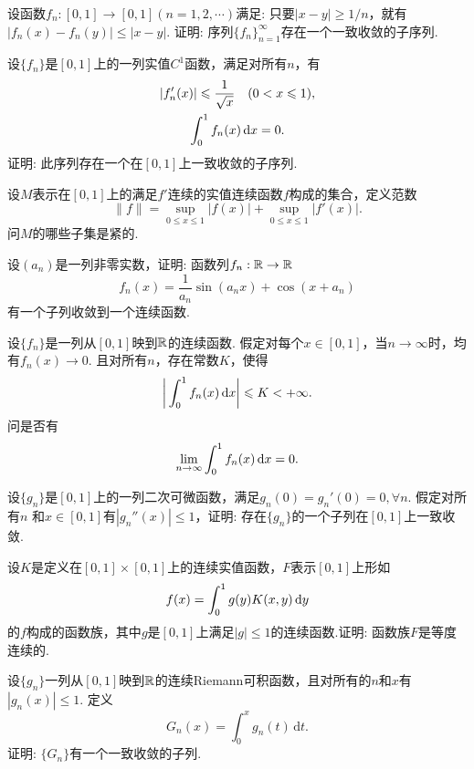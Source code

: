 \begin{example}
  设函数$f_n:[0,1]\to[0,1](n=1,2,\cdots)$满足: 只要$|x-y|\ge1/n$，就有$|f_n(x)-f_n(y)|\le|x-y|$. 证明: 序列$\{f_n\}_{n=1}^\infty$存在一个一致收敛的子序列.
\end{example}

\begin{example}
  设$\{f_n\}$是$[0,1]$上的一列实值$C^1$函数，满足对所有$n$，有
  \begin{gather*}
    |f_n'(x)| \leqslant \frac1{\sqrt x}\quad(0<x\leqslant 1),\\
    \int_0^1f_n(x)\,\mathrm dx = 0.
  \end{gather*}
  证明: 此序列存在一个在$[0,1]$上一致收敛的子序列.
\end{example}

\begin{example}
  设$M$表示在$[0,1]$上的满足$f'$连续的实值连续函数$f$构成的集合，定义范数
  \[ \|f\| = \sup_{0\le x\le1}|f(x)| + \sup_{0\le x\le1}|f'(x)|. \]
  问$M$的哪些子集是紧的.
\end{example}

\begin{example}
  设$(a_n)$是一列非零实数，证明: 函数列$f_n:\mathbb R\to\mathbb R$
  \[ f_n(x) = \frac1{a_n}\sin(a_n x)+ \cos (x+a_n) \]
  有一个子列收敛到一个连续函数.
\end{example}

\begin{example}
  设$\{f_n\}$是一列从$[0,1]$映到$\mathbb R$的连续函数. 假定对每个$x\in[0,1]$，当$n\to\infty$时，均有$f_n(x)\to0$. 且对所有$n$，存在常数$K$，使得
  \[ \bigg| \int_0^1f_n(x)\,\mathrm dx \bigg| \leqslant K <+\infty. \]
  问是否有
  \[ \lim_{n\to\infty}\int_0^1f_n(x)\,\dx = 0. \]
\end{example}

\begin{example}
  设$\{g_n\}$是$[0,1]$上的一列二次可微函数，满足$g_n(0)=g_n'(0)=0,\forall n$. 假定对所有$n$ 和$x\in[0,1]$有$|g_n''(x)|\le 1$，证明: 存在$\{g_n\}$的一个子列在$[0,1]$上一致收敛.
\end{example}

\begin{example}
  设$K$是定义在$[0,1]\times[0,1]$上的连续实值函数，$F$表示$[0,1]$上形如
  \[ f(x) = \int_0^1g(y)K(x,y)\,\mathrm dy \]
  的$f$构成的函数族，其中$g$是$[0,1]$上满足$|g|\le1$的连续函数.证明: 函数族$F$是等度连续的.
\end{example}

\begin{example}
  设$\{g_n\}$一列从$[0,1]$映到$\mathbb R$的连续Riemann可积函数，且对所有的$n$和$x$有$|g_n(x)|\le1$. 定义
  \[ G_n(x) = \int_0^xg_n(t)\,\mathrm dt. \]
  证明: $\{G_n\}$有一个一致收敛的子列.
\end{example}

